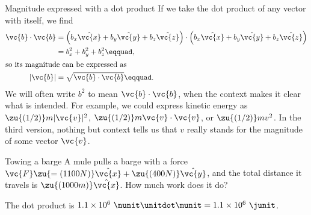         \begin{eg}{Magnitude expressed with a dot product}\label{eg:magnitudedot}
        If we take the dot product of any vector  with itself, we find
        \begin{align*}        
                \vc{b}\cdot\vc{b}        &= 
                \left( b_{x}\hat{\vc{x}}+ b_{y}\hat{\vc{y}}+ b_z\hat{\vc{z}}\right)
                \cdot
                \left( b_{x}\hat{\vc{x}}+ b_{y}\hat{\vc{y}}+ b_z\hat{\vc{z}}\right) \\
                        &=  b_{x}^2+ b_{y}^2+ b_z^2\eqquad,\\
        \intertext{so its magnitude can be expressed as}
                |\vc{b}| &= \sqrt{\vc{b}\cdot\vc{b}}\eqquad.
        \end{align*}
        We will often write $b^2$ to mean $\vc{b}\cdot\vc{b}$, when the context makes it
        clear what is intended. For example, we could express kinetic energy as
        $\zu{(1/2)} m|\vc{v}|^2$, $\zu{(1/2)} m\vc{v}\cdot\vc{v}$,
        or $\zu{(1/2)} m v^2$. In the third version, nothing but context tells
        us that $v$ really stands for the magnitude of some vector $\vc{v}$.
        \end{eg}

        \begin{eg}{Towing a barge}
        \egquestion
        A mule pulls a barge with a force $\vc{F}\zu{=(1100 N)}\hat{\vc{x}}+\zu{(400 N)}\hat{\vc{y}}$,
        and the total distance it travels is $\zu{(1000 m)}\hat{\vc{x}}$. How much work does it do?

        \eganswer
        The dot product is $1.1\times10^6\ \nunit\unitdot\munit = 1.1\times10^6\ \junit$.
        \end{eg}

